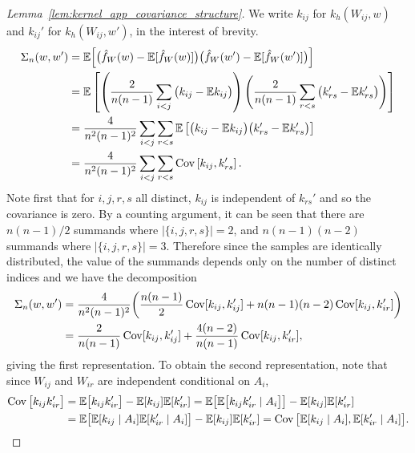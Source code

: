 \begin{proof}[Lemma~\ref{lem:kernel_app_covariance_structure}]

  We write $k_{i j}$ for $k_h(W_{i j},w)$
  and $k_{i j}'$ for $k_h(W_{i j},w')$, in the interest of brevity.
  \begin{align*}
    \Sigma_n(w,w')
    &=
    \mathbb{E}\Big[
      \big(
        \hat f_W(w)
        - \mathbb{E}[\hat f_W(w)]
      \big)
      \big(
        \hat f_W(w')
        - \mathbb{E}[\hat f_W(w')]
      \big)
    \Big] \\
    &=
    \mathbb{E}\left[
      \left(
        \frac{2}{n(n-1)}
        \sum_{i<j}
        \big(
          k_{i j} - \mathbb{E} k_{i j}
        \big)
      \right)
      \left(
        \frac{2}{n(n-1)}
        \sum_{r<s}
        \big(
          k_{rs}' - \mathbb{E} k_{rs}'
        \big)
      \right)
    \right] \\
    &=
    \frac{4}{n^2(n-1)^2}
    \sum_{i<j}
    \sum_{r<s}
    \mathbb{E}\left[
      \big(
        k_{i j} - \mathbb{E} k_{i j}
      \big)
      \big(
        k_{rs}' - \mathbb{E} k_{rs}'
      \big)
    \right] \\
    &=
    \frac{4}{n^2(n-1)^2}
    \sum_{i<j}
    \sum_{r<s}
    \operatorname{Cov}\left[
      k_{i j},
      k_{rs}'
    \right].
  \end{align*}
  Note first that
  for $i,j,r,s$ all distinct,
  $k_{i j}$ is independent of $k_{rs}'$
  and so the covariance is zero.
  By a counting argument,
  it can be seen that
  there are
  $n(n-1)/2$
  summands where
  $|\{i,j,r,s\}| = 2$,
  and
  $n(n-1)(n-2)$
  summands where
  $|\{i,j,r,s\}| = 3$.
  Therefore since the samples
  are identically distributed,
  the value of the summands
  depends only on the number of distinct indices
  and we have the decomposition
  \begin{align*}
    \Sigma_n(w,w')
    &=
    \frac{4}{n^2(n-1)^2}
    \bigg(
      \frac{n(n-1)}{2}
      \operatorname{Cov}[k_{i j}, k_{i j}']
      + n(n-1)(n-2)
      \operatorname{Cov}[k_{i j}, k_{i r}']
    \bigg) \\
    &=
    \frac{2}{n(n-1)}
    \operatorname{Cov}[k_{i j}, k_{i j}']
    + \frac{4(n-2)}{n(n-1)}
    \operatorname{Cov}[k_{i j}, k_{i r}'],
  \end{align*}
  giving the first representation.
  To obtain the second representation,
  note that since
  $W_{i j}$ and $W_{i r}$
  are independent conditional
  on $A_i$,
  \begin{align*}
    \operatorname{Cov}\big[
      k_{i j}
      k_{i r}'
    \big]
    &=
    \mathbb{E}\big[
      k_{i j}
      k_{i r}'
    \big]
    -
    \mathbb{E}[k_{i j}]
    \mathbb{E}[k_{i r}']
    =
    \mathbb{E}\big[
      \mathbb{E}\big[
        k_{i j}
        k_{i r}'
        \mid A_i
      \big]
    \big]
    -
    \mathbb{E}[k_{i j}]
    \mathbb{E}[k_{i r}'] \\
    &=
    \mathbb{E}\big[
      \mathbb{E}[k_{i j} \mid A_i]
      \mathbb{E}[k_{i r}' \mid A_i]
    \big]
    -
    \mathbb{E}[k_{i j}]
    \mathbb{E}[k_{i r}']
    =
    \operatorname{Cov}\big[
      \mathbb{E}[k_{i j} \mid A_i],
      \mathbb{E}[k_{i r}' \mid A_i]
    \big].
  \end{align*}
\end{proof}

